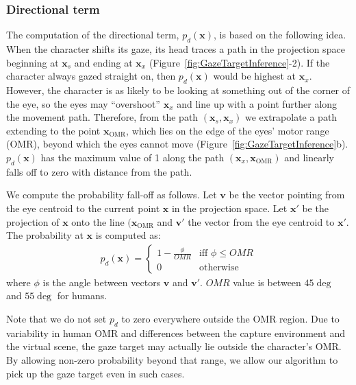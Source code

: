 \subsubsection{Directional term}

The computation of the directional term, $p_d(\mathbf{x})$, is based on the following idea. When the character shifts its gaze, its head traces a path in the projection space beginning at $\mathbf{x}_s$ and ending at $\mathbf{x}_x$ (Figure~\ref{fig:GazeTargetInference}-2). If the character always gazed straight on, then $p_d(\mathbf{x})$ would be highest at $\mathbf{x}_x$. However, the character is as likely to be looking at something out of the corner of the eye, so the eyes may ``overshoot'' $\mathbf{x}_x$ and line up with a point further along the movement path. Therefore, from the path $(\mathbf{x}_s, \mathbf{x}_x)$ we extrapolate a path extending to the point $\mathbf{x}_{\mathrm{OMR}}$, which lies on the edge of the eyes' motor range (OMR), beyond which the eyes cannot move (Figure~\ref{fig:GazeTargetInference}b). $p_d(\mathbf{x})$ has the maximum value of 1 along the path $(\mathbf{x}_x, \mathbf{x}_{\mathrm{OMR}})$ and linearly falls off to zero with distance from the path.

We compute the probability fall-off as follows. Let $\mathbf{v}$ be the vector pointing from the eye centroid to the current point $\mathbf{x}$ in the projection space. Let $\mathbf{x}'$ be the projection of $\mathbf{x}$ onto the line $(\mathbf{x}_{\mathrm{OMR}}$ and $\mathbf{v}'$ the vector from the eye centroid to $\mathbf{x}'$. The probability at $\mathbf{x}$ is computed as:
%
\begin{align} \label{eq:GazeDirectionProbability}
p_d(\mathbf{x}) =
\begin{cases}
1 - \frac{\phi}{OMR} & \text{iff } \phi \leq OMR \\
0 & \text{otherwise}
\end{cases}
\end{align}
%
where $\phi$ is the angle between vectors $\mathbf{v}$ and $\mathbf{v}'$. $OMR$ value is between $45\deg$ and $55\deg$ for humans.

Note that we do not set $p_d$ to zero everywhere outside the OMR region. Due to variability in human OMR and differences between the capture environment and the virtual scene, the gaze target may actually lie outside the character's OMR. By allowing non-zero probability beyond that range, we allow our algorithm to pick up the gaze target even in such cases.

